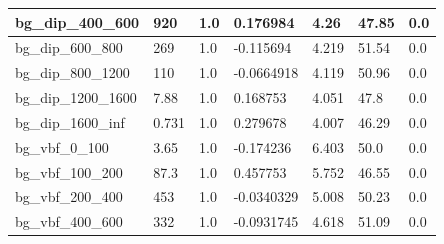 \documentclass[a4paper, 10pt]{article}
\begin{document}
\begin{table}[H]
\begin{center}
\begin{tabular}{|m{23.0mm}|m{23.0mm}|m{18.0mm}|m{19.0mm}|m{19.0mm}|m{19.0mm}|m{19.0mm}|}
      \hline
      {\cellcolor{white}         bg\_dip\_400\_600}& {\cellcolor{white}         920}& {\cellcolor{white}         1.0}& {\cellcolor{white}         0.176984}& {\cellcolor{white}         4.26}& {\cellcolor{red}         47.85}& {\cellcolor{red}         0.0}\\
      \hline
      {\cellcolor{white}         bg\_dip\_600\_800}& {\cellcolor{white}         269}& {\cellcolor{white}         1.0}& {\cellcolor{white}         -0.115694}& {\cellcolor{white}         4.219}& {\cellcolor{red}         51.54}& {\cellcolor{red}         0.0}\\
      \hline
      {\cellcolor{white}         bg\_dip\_800\_1200}& {\cellcolor{white}         110}& {\cellcolor{white}         1.0}& {\cellcolor{white}         -0.0664918}& {\cellcolor{white}         4.119}& {\cellcolor{red}         50.96}& {\cellcolor{red}         0.0}\\
      \hline
      {\cellcolor{white}         bg\_dip\_1200\_1600}& {\cellcolor{white}         7.88}& {\cellcolor{white}         1.0}& {\cellcolor{white}         0.168753}& {\cellcolor{white}         4.051}& {\cellcolor{red}         47.8}& {\cellcolor{red}         0.0}\\
      \hline
      {\cellcolor{white}         bg\_dip\_1600\_inf}& {\cellcolor{white}         0.731}& {\cellcolor{white}         1.0}& {\cellcolor{white}         0.279678}& {\cellcolor{white}         4.007}& {\cellcolor{red}         46.29}& {\cellcolor{red}         0.0}\\
      \hline
      {\cellcolor{white}         bg\_vbf\_0\_100}& {\cellcolor{white}         3.65}& {\cellcolor{white}         1.0}& {\cellcolor{white}         -0.174236}& {\cellcolor{white}         6.403}& {\cellcolor{red}         50.0}& {\cellcolor{red}         0.0}\\
      \hline
      {\cellcolor{white}         bg\_vbf\_100\_200}& {\cellcolor{white}         87.3}& {\cellcolor{white}         1.0}& {\cellcolor{white}         0.457753}& {\cellcolor{white}         5.752}& {\cellcolor{red}         46.55}& {\cellcolor{red}         0.0}\\
      \hline
      {\cellcolor{white}         bg\_vbf\_200\_400}& {\cellcolor{white}         453}& {\cellcolor{white}         1.0}& {\cellcolor{white}         -0.0340329}& {\cellcolor{white}         5.008}& {\cellcolor{red}         50.23}& {\cellcolor{red}         0.0}\\
      \hline
      {\cellcolor{white}         bg\_vbf\_400\_600}& {\cellcolor{white}         332}& {\cellcolor{white}         1.0}& {\cellcolor{white}         -0.0931745}& {\cellcolor{white}         4.618}& {\cellcolor{red}         51.09}& {\cellcolor{red}         0.0}\\

\end{tabular}
\end{center}
\end{table}
\end{document}
